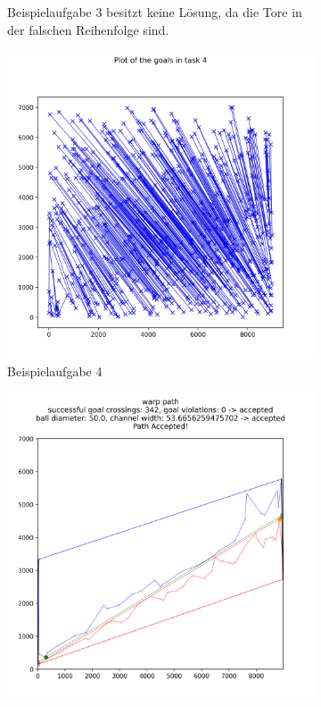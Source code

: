 \begin{figure}
\begin{subfigure}[b]{0.49\textwidth}
         \caption{Beispielaufgabe 3 besitzt keine Lösung, da die Tore in der falschen Reihenfolge sind.}
         \label{fig:five over x}
     \end{subfigure}
     \hfill
     \begin{subfigure}[b]{0.49\textwidth}
         \centering
         \includegraphics[width=\textwidth]{images/task_4.jpeg}
         \caption{Beispielaufgabe 4}
         \label{fig:five over x}
     \end{subfigure}
     \hfill
     \begin{subfigure}[b]{0.49\textwidth}
         \centering
         \includegraphics[width=\textwidth]{images/solution_task_4.png}

\end{subfigure}
\end{figure}

